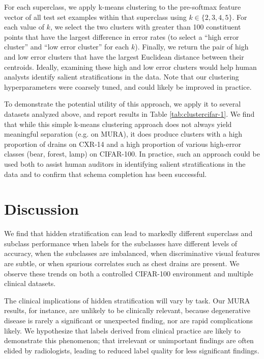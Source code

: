 \documentclass[sigconf]{acmart}
\begin{document}
For each superclass, we apply k-means clustering to the pre-softmax feature vector of all test set examples within that superclass using $k \in \{2,3,4,5\}$.
For each value of $k$, we select the two clusters with greater than 100 constituent points that have the largest difference in error rates (to select a ``high error cluster'' and ``low error cluster'' for each $k$).
Finally, we return the pair of high and low error clusters that have the largest Euclidean distance between their centroids.
Ideally, examining these high and low error clusters would help human analysts identify salient stratifications in the data.
Note that our clustering hyperparameters were coarsely tuned, and could likely be improved in practice.

To demonstrate the potential utility of this approach, we apply it to several datasets analyzed above, and report results in Table \ref{tab:clustercifar-1}.  
We find that while this simple k-means clustering approach does not always yield meaningful separation (e.g. on MURA), it does produce clusters with a high proportion of drains on CXR-14 and a high proportion of various high-error classes (bear, forest, lamp) on CIFAR-100.  
 In practice, such an approach could be used both to assist human auditors in identifying salient stratifications in the data and to confirm that schema completion has been successful.

\section{Discussion}
\label{sec:discussion}

We find that hidden stratification can lead to markedly different superclass and subclass performance when labels for the subclasses have different levels of accuracy, when the subclasses are imbalanced, when discriminative visual features are subtle, or when spurious correlates such as chest drains are present.
We observe these trends on both a controlled CIFAR-100 environment and multiple clinical datasets.

The clinical implications of hidden stratification will vary by task. 
Our MURA results, for instance, are unlikely to be clinically relevant, because degenerative disease is rarely a significant or unexpected finding, nor are rapid complications likely. 
We hypothesize that labels derived from clinical practice are likely to demonstrate this phenomenon; that irrelevant or unimportant findings are often elided by radiologists, leading to reduced label quality for less significant findings.
\end{document}
